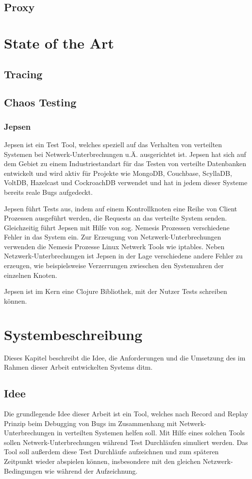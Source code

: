 \documentclass[a4paper]{report}
\begin{document}
\section{Proxy}

\chapter{State of the Art}
\cite{debugging_distributed_systems_2016}
\section{Tracing}
\section{Chaos Testing}
\cite{why_is_random_testing_effective}
\subsection{Jepsen}
\cite{abstracting_the_geniuses}

Jepsen ist ein Test Tool, welches speziell auf das Verhalten von verteilten Systemen bei Netwerk-Unterbrechungen u.Ä. ausgerichtet ist.
Jepsen hat sich auf dem Gebiet zu einem Industriestandart für das Testen von verteilte Datenbanken entwickelt und wird aktiv für Projekte wie
MongoDB, Couchbase, ScyllaDB, VoltDB, Hazelcast und CockroachDB verwendet und hat in jedem dieser Systeme bereits reale Bugs aufgedeckt.

Jepsen führt Tests aus, indem auf einem Kontrollknoten eine Reihe von Client Prozessen ausgeführt werden, die Requests an das verteilte System
senden. Gleichzeitig führt Jepsen mit Hilfe von sog. Nemesis Prozessen verschiedene Fehler in das System ein. Zur Erzeugung von
Netzwerk-Unterbrechungen verwenden die Nemesis Prozesse Linux Netwerk Tools wie iptables. Neben Netzwerk-Unterbrechungen ist Jepsen in
der Lage verschiedene andere Fehler zu erzeugen, wie beispielsweise Verzerrungen zwieschen den Systemuhren der einzelnen Knoten.

Jepsen ist im Kern eine Clojure Bibliothek, mit der Nutzer Tests schreiben können.


\chapter{Systembeschreibung}
Dieses Kapitel beschreibt die Idee, die Anforderungen und die Umsetzung des im Rahmen dieser Arbeit entwickelten Systems ditm.
\section{Idee}
Die grundlegende Idee dieser Arbeit ist ein Tool, welches nach Record and Replay Prinzip beim Debugging von Bugs im Zusammenhang
mit Netwerk-Unterbrechungen in verteilten Systemen helfen soll. Mit Hilfe eines solchen Tools sollen Netwerk-Unterbrechungen
während Test Durchläufen simuliert werden. Das Tool soll außerdem diese Test Durchläufe aufzeichnen und zum späteren Zeitpunkt
wieder abspielen können, insbesondere mit den gleichen Netzwerk-Bedingungen wie während der Aufzeichnung.
\end{document}
